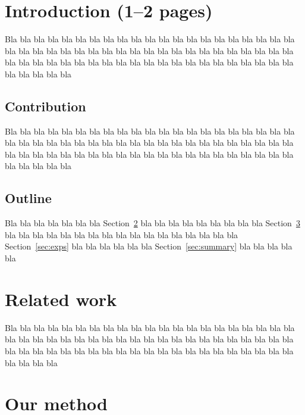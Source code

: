 \documentclass[a4paper,12pt]{article}
\begin{document}
\section{Introduction (1--2 pages)}
\label{sec:intro}

Bla bla bla bla bla bla bla bla bla bla bla bla bla bla bla bla bla 
bla bla bla bla bla bla bla bla bla bla bla bla bla bla bla bla bla 
bla bla bla bla bla bla bla bla bla bla bla bla bla bla bla bla bla 
bla bla bla bla bla bla bla bla bla bla bla bla bla bla bla bla bla

\subsection{Contribution}
Bla bla bla bla bla bla bla bla bla bla bla bla bla bla bla bla bla 
bla bla bla bla bla bla bla bla bla bla bla bla bla bla bla bla bla 
bla bla bla bla bla bla bla bla bla bla bla bla bla bla bla bla bla 
bla bla bla bla bla bla bla bla bla bla bla bla bla bla bla bla bla

\subsection{Outline}
Bla bla bla bla bla bla bla Section~\ref{sec:relwork} bla bla bla bla 
bla bla bla bla bla Section~\ref{sec:method} bla bla bla bla bla bla 
bla bla bla bla bla bla bla bla bla bla bla Section~\ref{sec:exps}
bla bla bla bla bla bla Section~\ref{sec:summary} bla bla bla bla bla

\section{Related work}
\label{sec:relwork}

Bla bla bla bla bla bla bla bla bla bla bla bla bla bla bla bla bla 
bla bla bla bla bla bla bla bla bla bla bla bla bla bla bla bla bla 
bla bla bla bla bla bla bla bla bla bla bla bla bla bla bla bla bla 
bla bla bla bla bla bla bla bla bla bla \cite{RussellNorvigAIBook3rd}
bla bla bla bla bla bla

\section{Our method}
\label{sec:method}
\end{document}
